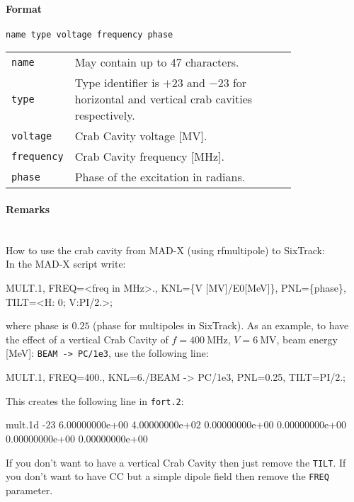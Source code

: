 \paragraph{Format} \texttt{name type voltage frequency phase}

\bigskip
\begin{tabular}{@{}lp{0.8\linewidth}}
    \texttt{name} & May contain up to 47 characters. \\
    \texttt{type} & Type identifier is $+23$ and $-23$ for horizontal and vertical crab cavities respectively. \\
    \texttt{voltage} & Crab Cavity voltage [MV]. \\
    \texttt{frequency} & Crab Cavity frequency [MHz]. \\
    \texttt{phase} & Phase of the excitation in radians.
\end{tabular}

\paragraph{Remarks}~\\

\noindent How to use the crab cavity from MAD-X (using rfmultipole) to SixTrack:\\
\bigskip
\noindent In the MAD-X script write:
\begin{cverbatim}
MULT.1, FREQ=<freq in MHz>., KNL=\{V [MV]/E0[MeV]\}, PNL=\{phase\}, TILT=<H: 0; V:PI/2.>;
\end{cverbatim}
where phase is $0.25$ (phase for multipoles in SixTrack).
As an example, to have the effect of a vertical Crab Cavity of $f=400~\mathrm{MHz}$, $V=6~\mathrm{MV}$, beam energy [MeV]: \texttt{BEAM -> PC/1e3}, use the following line:\\
\begin{cverbatim}
MULT.1, FREQ=400., KNL={6./BEAM -> PC/1e3}, PNL={0.25}, TILT=PI/2.;
\end{cverbatim}
This creates the following line in \texttt{fort.2}:
\begin{cverbatim}
mult.1d  -23  6.00000000e+00  4.00000000e+02  0.00000000e+00  0.00000000e+00  0.00000000e+00  0.00000000e+00
\end{cverbatim}
If you don’t want to have a vertical Crab Cavity then just remove the \texttt{TILT}.
If you don’t want to have CC but a simple dipole field then remove the \texttt{FREQ} parameter.

